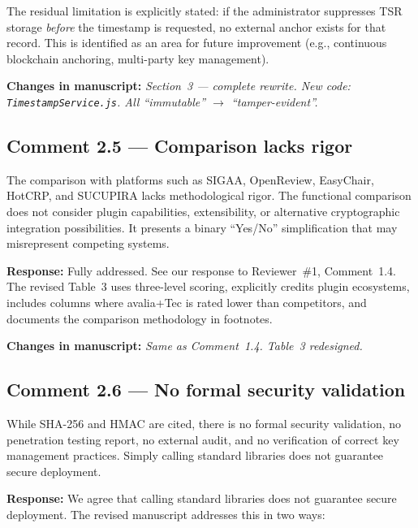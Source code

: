 \documentclass[11pt,a4paper]{article}
\newcommand{\response}[1]{\par\noindent\textcolor{responsecolor}{\textbf{Response:}} #1}
\newcommand{\change}[1]{\par\noindent\textcolor{changecolor}{\textbf{Changes in manuscript:}} \textit{#1}}
\begin{document}
\noindent The residual limitation is explicitly stated: if the administrator suppresses TSR storage \emph{before} the timestamp is requested, no external anchor exists for that record. This is identified as an area for future improvement (e.g., continuous blockchain anchoring, multi-party key management).

\change{Section~3 --- complete rewrite. New code: \texttt{TimestampService.js}. All ``immutable'' $\to$ ``tamper-evident''.}

\bigskip

\subsection*{Comment 2.5 --- Comparison lacks rigor}

\begin{reviewerbox}
The comparison with platforms such as SIGAA, OpenReview, EasyChair, HotCRP, and SUCUPIRA lacks methodological rigor. The functional comparison does not consider plugin capabilities, extensibility, or alternative cryptographic integration possibilities. It presents a binary ``Yes/No'' simplification that may misrepresent competing systems.
\end{reviewerbox}

\response{Fully addressed. See our response to Reviewer~\#1, Comment~1.4. The revised Table~3 uses three-level scoring, explicitly credits plugin ecosystems, includes columns where avalia+Tec is rated lower than competitors, and documents the comparison methodology in footnotes.}

\change{Same as Comment~1.4. Table~3 redesigned.}

\bigskip

\subsection*{Comment 2.6 --- No formal security validation}

\begin{reviewerbox}
While SHA-256 and HMAC are cited, there is no formal security validation, no penetration testing report, no external audit, and no verification of correct key management practices. Simply calling standard libraries does not guarantee secure deployment.
\end{reviewerbox}

\response{We agree that calling standard libraries does not guarantee secure deployment. The revised manuscript addresses this in two ways:}
\end{document}
